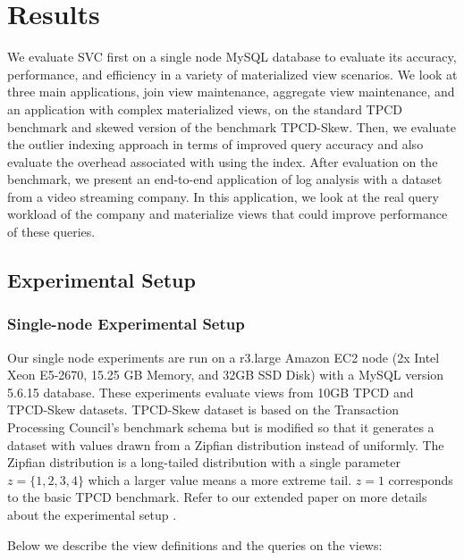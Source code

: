 \vspace{-.5em}
\section{Results}
\label{exp}
We evaluate SVC first on a single node MySQL database to evaluate its accuracy, performance, and efficiency in a variety of materialized view 
scenarios.
We look at three main applications, join view maintenance, aggregate view maintenance, and an application with complex materialized views, on the standard TPCD benchmark 
and skewed version of the benchmark TPCD-Skew.
Then, we evaluate the outlier indexing approach in terms of improved query accuracy and also evaluate the overhead associated with using the index.
After evaluation on the benchmark, we present an end-to-end application of log analysis with a dataset from a video streaming company.
In this application, we look at the real query workload of the company and materialize views that could improve performance of these queries.

\subsection{Experimental Setup}\vspace{-.5em}
\subsubsection{Single-node Experimental Setup}
Our single node experiments are run on a r3.large Amazon EC2 node (2x Intel Xeon E5-2670, 15.25 GB Memory, and 32GB SSD Disk) with a MySQL version 5.6.15 database.
These experiments evaluate views from 10GB TPCD and TPCD-Skew datasets.
TPCD-Skew dataset \cite{tpcdskew} is based on the Transaction Processing Council's benchmark
schema but is modified so that it generates a dataset with values drawn from a Zipfian distribution instead of uniformly.
The Zipfian distribution \cite{mitzenmacher2004brief} is a long-tailed distribution with a single parameter $z=\{1,2,3,4\}$ which a larger
value means a more extreme tail.
$z=1$ corresponds to the basic TPCD benchmark. 
Refer to our extended paper on more details about the experimental setup \cite{technicalReport}.

Below we describe the view definitions and the queries on the views:

